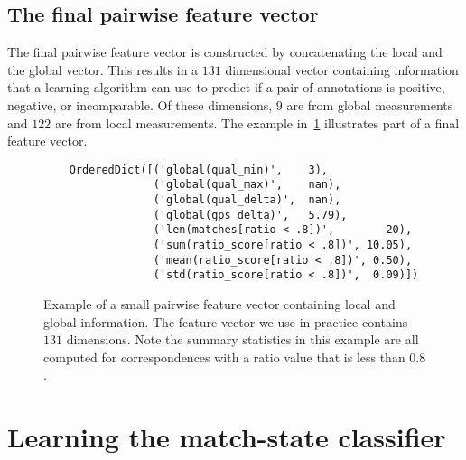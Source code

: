
\FloatBarrier{}
\subsection{The final pairwise feature vector}

The final pairwise feature vector is constructed by concatenating the local and the global vector.
This results in a $131$ dimensional vector containing information that a learning algorithm can use to predict if
  a pair of annotations is positive, negative, or incomparable.
Of these dimensions, $9$ are from global measurements and $122$ are from local measurements.
The example in~\cref{fig:PairFeatVec} illustrates part of a final feature vector.

\begin{figure}
\begin{verbatim}
    OrderedDict([('global(qual_min)',    3),
                 ('global(qual_max)',    nan),
                 ('global(qual_delta)',  nan),
                 ('global(gps_delta)',   5.79),
                 ('len(matches[ratio < .8])',        20),
                 ('sum(ratio_score[ratio < .8])', 10.05),
                 ('mean(ratio_score[ratio < .8])', 0.50),
                 ('std(ratio_score[ratio < .8])',  0.09)])
\end{verbatim}
\caption[A pairwise feature vector]{ %
Example of a small pairwise feature vector containing local and global information.
The feature vector we use in practice contains $131$ dimensions.
Note the summary statistics in this example are all computed for correspondences with a ratio value that is less
  than $0.8$.
}
\label{fig:PairFeatVec}
\end{figure}


\section{Learning the match-state classifier}\label{sec:learnclf}

